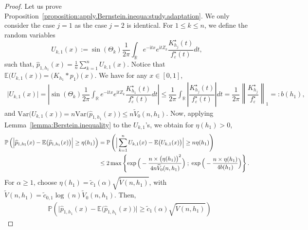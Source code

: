 \documentclass[11pt,a4paper,openany]{article}
\newcommand{\Var}{\mbox{Var}}
\def\R{\mathbb{R}}
\begin{document}
 \begin{proof} Let us prove Proposition~\ref{proposition:apply.Bernstein.inequa:study.adaptation}. We only consider the case $j=1$ as the case $j=2$ is identical. 
For $1 \leq k \leq n$, we define the random variables$$U_{k,1}(x) := \sin (\Theta_k) \dfrac{1}{2\pi} \displaystyle{ \int_{\R} } e^{-\mathrm{i} tx} e^{\mathrm{i} t Z_{k}} \dfrac{ K_{h_{j}}^\star(t) }{ f^{\star}_\varepsilon(t) } dt, $$ such that, $\widehat{p}_{1 , h_{1}}(x) = \frac{1}{n} \sum_{k=1}^{n} U_{k , 1}(x)$. Notice that $\mathbb{E} \big( U_{k , 1}(x) \big) = \big( K_{h_{1}} \ast p_{1} \big)(x)$. 
We have for any $x \in  [0,1] $,   
\begin{align}
	\big| U_{k,1}(x) \big| = \left|  \sin(\Theta_{k})  \dfrac{1}{2\pi} \displaystyle{ \int_{\R} } e^{-\mathrm{i} tx} e^{\mathrm{i} t Z_{k}} \dfrac{ K_{h_{1}}^\star(t) }{ f^{\star}_\varepsilon(t) } dt  \right|  \leq \dfrac{1}{2\pi} \displaystyle{ \int_{\R} } \left|  \dfrac{ K_{h_{j}}^\star(t) }{ f^{\star}_\varepsilon(t) } \right| dt  = \dfrac{1}{2\pi} \left\|  \dfrac{ K_{h_{j}}^\star }{ f^{\star}_\varepsilon } \right\|_{1}  =:  b(h_{1}) , 
\end{align}  
and $\Var \big( U_{k , 1}(x) \big) = n \Var \big( \widehat{p}_{1,h_{1}} (x) \big) \leq n \widetilde V_{0}(n , h_{1})$. Now, applying Lemma~\ref{lemma:Berstein.inequality} to the $U_{k,1}$'s, we obtain for $\eta(h_{1}) > 0$, 
\begin{align*}
	\mathbb{P} \left(  \Big| \widehat{p}_{1 , h_{1}}(x) - \mathbb{E} \big( \widehat{p}_{1 , h_{1}}(x) \big) \Big|  \geq  \eta(h_{1})  \right)  &=  \mathbb{P} \left(  \Big| \sum_{k=1}^{n} U_{k,1}(x) - \mathbb{E} \big( U_{k,1}(x) \big) \Big|  \geq  n \eta(h_{1}) \right)  
	\\
	&\leq  2 \max  \left\{   \exp \Big( - \dfrac{n \times \big( \eta(h_{1}) \big)^{2}}{ 4 n \widetilde V_{0}(n, h_{1}) } \Big) \hspace{0.1cm}  ;    \hspace{0.1cm}   \exp \Big( - \dfrac{ n \times  \eta(h_{1}) }{ 4 b(h_{1}) } \Big)  \right\}  . 
\end{align*} 
For $\alpha \geq 1$, choose $\eta(h_{1}) = \tilde c_{1}(\alpha) \sqrt{ \widetilde{V}(n , h_{1}) }$, with 
$	\widetilde{V}(n , h_{1})  = \tilde  c_{0,1}  \log(n)  \widetilde V_{0}(n, h_{1})  . $
Then, 
\begin{align}
	& \mathbb{P}   \left(  \Big| \widehat{p}_{1 , h_{1}}(x) - \mathbb{E} \big( \widehat{p}_{1 , h_{1}}(x) \big) \Big|  \geq  \tilde c_{1}(\alpha) \sqrt{ \widetilde{V}(n , h_{1}) }    \right)  \nonumber  

\end{align}
\end{proof}
\end{document}
